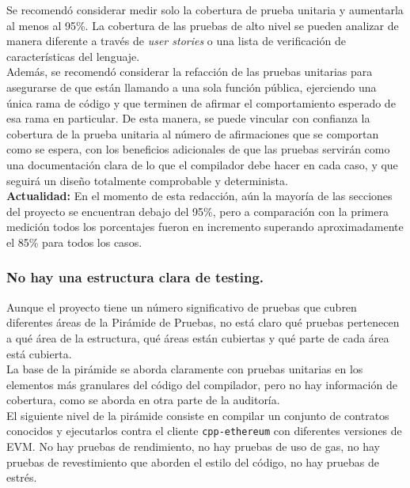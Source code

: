 Se recomendó considerar medir solo la cobertura de prueba unitaria y aumentarla al menos al 95\%. La cobertura de las pruebas de alto nivel se pueden analizar de manera diferente a través de \textit{user stories} o una lista de verificación de características del lenguaje.\\

Además, se recomendó considerar la refacción de las pruebas unitarias para asegurarse de que están llamando a una sola función pública, ejerciendo una única rama de código y que terminen de afirmar el comportamiento esperado de esa rama en particular. De esta manera, se puede vincular con confianza la cobertura de la prueba unitaria al número de afirmaciones que se comportan como se espera, con los beneficios adicionales de que las pruebas servirán como una documentación clara de lo que el compilador debe hacer en cada caso, y que seguirá un diseño totalmente comprobable y determinista.\\

\textbf{Actualidad:} En el momento de esta redacción, aún la mayoría de las secciones del proyecto se encuentran debajo del 95\%, pero a comparación con la primera medición todos los porcentajes fueron en incremento superando aproximadamente el 85\%\cite{CodeCovEthereumSolidityCurrent} para todos los casos.


\subsubsection{No hay una estructura clara de testing.}
Aunque el proyecto tiene un número significativo de pruebas que cubren diferentes áreas de la Pirámide de Pruebas, no está claro qué pruebas pertenecen a qué área de la estructura, qué áreas están cubiertas y qué parte de cada área está cubierta.\\

La base de la pirámide se aborda claramente con pruebas unitarias en los elementos más granulares del código del compilador, pero no hay información de cobertura, como se aborda en otra parte de la auditoría.\\

El siguiente nivel de la pirámide consiste en compilar un conjunto de contratos conocidos y ejecutarlos contra el cliente \verb|cpp-ethereum| con diferentes versiones de EVM.
No hay pruebas de rendimiento, no hay pruebas de uso de gas, no hay pruebas de revestimiento que aborden el estilo del código, no hay pruebas de estrés.\\


